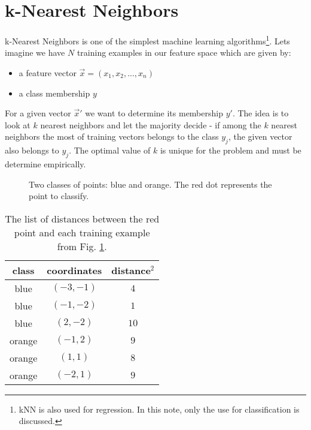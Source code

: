 \section{k-Nearest Neighbors}
\label{sec: knn}

k-Nearest Neighbors is one of the simplest machine learning algorithms\footnote{kNN is also used for regression. In this note, only the use for classification is discussed.}. Lets imagine we have $N$ training examples in our feature space which are given by:

\begin{itemize}
  \item a feature vector $\vec x = (x_1, x_2, ... , x_n)$
  \item a class membership $y$
\end{itemize}

For a given vector $\vec x'$ we want to determine its membership $y'$. The idea is to look at $k$ nearest neighbors and let the majority decide - if among the $k$ nearest neighbors the most of training vectors belongs to the class $y_j$, the given vector also belongs to $y_j$. The optimal value of $k$ is unique for the problem and must be determine empirically. 

\begin{figure}

  \centering
  \caption{Two classes of points: blue and orange. The red dot represents the point to classify.}
  \label{fig: knnExample}
  
\end{figure}

\begin{table}
\begin{center}
\begin{tabular}{c | c | c}

class & coordinates & distance$^2$ \\ \hline
\color{blue}blue     & $(-3,-1)$ & $4$  \\
\color{blue}blue     & $(-1,-2)$ & $1$  \\
\color{blue}blue     & $(2,-2)$  & $10$ \\ \hline
\color{orange}orange & $(-1,2)$  & $9$  \\
\color{orange}orange & $(1,1)$   & $8$  \\
\color{orange}orange & $(-2,1)$  & $9$  \\

\end{tabular}
\end{center}

\caption{The list of distances between the red point and each training example from Fig. \ref{fig: knnExample}.}
\label{tab: knnExDist}

\end{table}

